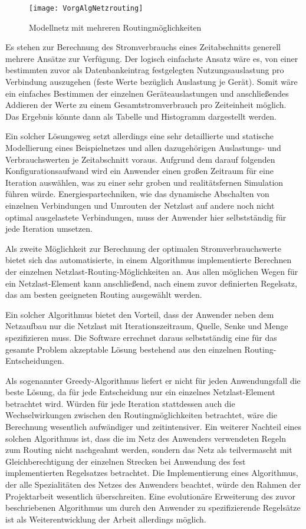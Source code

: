 \begin{figure}[htb]
	\centering
	\texttt{[image: VorgAlgNetzrouting]}
	\caption{Modellnetz mit mehreren Routingmöglichkeiten}
	\label{fig:VorgAlgNetzrouting}
\end{figure}

Es stehen zur Berechnung des Stromverbrauchs eines Zeitabschnitts generell mehrere Ansätze zur Verfügung. Der logisch einfachste Ansatz wäre es, von einer bestimmten zuvor als Datenbankeintrag festgelegten Nutzungsauslastung pro Verbindung auszugehen (feste Werte bezüglich Auslastung je Gerät). Somit wäre ein einfaches Bestimmen der einzelnen Geräte\-aus\-las\-tungen und anschließendes Addieren der Werte zu einem Gesamtstromverbrauch pro Zeiteinheit möglich. Das Ergebnis könnte dann als Tabelle und Histogramm dargestellt werden.

Ein solcher Lösungsweg setzt allerdings eine sehr detaillierte und statische Modellierung eines Beispielnetzes und allen dazugehörigen Auslastungs- und Verbrauchswerten je Zeitabschnitt voraus. Aufgrund dem darauf folgenden Konfigurationsaufwand wird ein Anwender einen großen Zeitraum für eine Iteration auswählen, was zu einer sehr groben und realitätsfernen Simulation führen würde. Energiespartechniken, wie das dynamische Abschalten von einzelnen Verbindungen und Umrouten der Netzlast auf andere noch nicht optimal ausgelastete Verbindungen, muss der Anwender hier selbstständig für jede Iteration umsetzen.

Als zweite Möglichkeit zur Berechnung der optimalen Stromverbrauchswerte bietet sich das automatisierte, in einem Algorithmus implementierte Berechnen der einzelnen Netz\-last-Routing-Mög\-lich\-kei\-ten an. Aus allen möglichen Wegen für ein Netzlast-Element kann anschließend, nach einem zuvor definierten Regelsatz, das am besten geeigneten Routing ausgewählt werden.

Ein solcher Algorithmus bietet den Vorteil, dass der Anwender neben dem Netzaufbau nur die Netzlast mit Iterationszeitraum, Quelle, Senke und Menge spezifizieren muss. Die Software errechnet daraus selbstständig eine für das gesamte Problem akzeptable Lösung bestehend aus den einzelnen Routing-Entscheidungen.

Als sogenannter Greedy-Algorithmus liefert er nicht für jeden Anwendungsfall die beste Lösung, da für jede Entscheidung nur ein einzelnes Netzlast-Element betrachtet wird.
Würden für jede Iteration stattdessen auch die Wechselwirkungen zwischen den Routingmöglichkeiten betrachtet, wäre die Berechnung wesentlich aufwändiger und zeitintensiver.
Ein weiterer Nachteil eines solchen Algorithmus ist, dass die im Netz des Anwenders verwendeten Regeln zum Routing nicht nachgeahmt werden, sondern das Netz als teilvermascht mit Gleichberechtigung der einzelnen Strecken bei Anwendung des fest implementierten Regelsatzes betrachtet.
Die Implementierung eines Algorithmus, der alle Spezialitäten des Netzes des Anwenders beachtet, würde den Rahmen der Projektarbeit wesentlich überschreiten. Eine evolutionäre Erweiterung des zuvor beschriebenen Algorithmus um durch den Anwender zu spezifizierende Regelsätze ist als Weiterentwicklung der Arbeit allerdings möglich.

